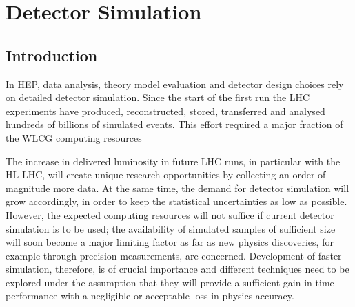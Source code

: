 \documentclass[11pt,a4paper]{article}
\begin{document}

\hypertarget{detector-simulation}{%
\section{Detector Simulation}\label{detector-simulation}}

\hypertarget{introduction-2}{%
\subsection{Introduction}\label{introduction-2}}

In HEP, data analysis, theory model evaluation and detector design
choices rely on detailed detector simulation. Since the start of the
first run the LHC experiments have produced, reconstructed, stored,
transferred and analysed hundreds of billions of simulated events. This
effort required a major fraction of the WLCG computing 
resources~\cite{ALICE-TDR-12, ATLAS-TDR-17, CMS-TDR-7, LHCb-TDR-11, WLCG-CM-Update, 
ALICE-TDR-019, LHCb-TDR-018, ATLAS-LHCC-2019-02, CMS-LHCC-2019-09}

The increase in delivered luminosity in future LHC runs, in particular
with the HL-LHC, will create unique research opportunities by collecting
an order of magnitude more data. At the same time, the demand for
detector simulation will grow accordingly, in order to keep the
statistical uncertainties as low as possible. However, the expected
computing resources will not suffice if current detector simulation is
to be used; the availability of simulated samples of sufficient size
will soon become a major limiting factor as far as new physics
discoveries, for example through precision measurements, are concerned.
Development of faster simulation, therefore, is of crucial importance
and different techniques need to be explored under the assumption that
they will provide a sufficient gain in time performance with a
negligible or acceptable loss in physics accuracy.
\end{document}
